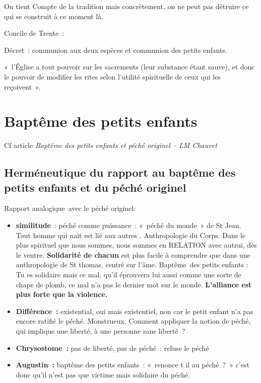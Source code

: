 On tient Compte de la tradition mais concrètement, on ne peut pas
détruire ce qui se construit à ce moment là.

Concile de Trente~:

Décret~: communion aux deux espèces et communion des petits enfants.
 
    «~l'Église a tout pouvoir sur les sacrements (leur substance étant
sauve), et donc le pouvoir de modifier les rites selon l'utilité
spirituelle de ceux qui les reçoivent~».
 


\hypertarget{d.-baptuxeame-des-petits-enfants}{%
\section{Baptême des petits
enfants}\label{d.-baptuxeame-des-petits-enfants}}

Cf article \emph{Baptême des petits enfants et péché originel -- LM
Chauvet}

\hypertarget{hermuxe9neutique-du-rapport-au-baptuxeame-des-petits-enfants-et-du-puxe9chuxe9-originel}{%
\subsection{Herméneutique du rapport au baptême des petits enfants et du
péché
originel}\label{hermuxe9neutique-du-rapport-au-baptuxeame-des-petits-enfants-et-du-puxe9chuxe9-originel}}

Rapport analogique~avec le péché originel:

\begin{itemize}
\item
  \textbf{similitude}~: péché comme puissance~: «~péché du monde~» de St
  Jean. Tout homme qui nait est lié aux autres . Anthropologie du Corps.
  Dans le plus spirituel que nous sommes, nous sommes en RELATION avec
  autrui, dès le ventre. \textbf{Solidarité de chacun} est plus facile à
  comprendre que dans une anthropologie de St thomas, centré sur l'âme.
  Baptême~des petits enfants : Tu es solidaire mais ce mal, qu'il
  éprouvera lui aussi comme une sorte de chape de plomb, ce mal n'a pas
  le dernier mot sur le monde. \textbf{L'alliance est plus forte que la
  violence.}
\item
  \textbf{Différence~:} existential, oui mais existentiel, non car le
  petit enfant n'a pas encore ratifié le péché. Monstrueux. Comment
  appliquer la notion de péché, qui implique une liberté, à une personne
  sans liberté~?
\item
  \textbf{Chrysostome~:} pas de liberté, pas de péché~: refuse le péché
\item
  \textbf{Augustin~:} baptême des petits enfants~: «~renonce t il au
  péché~?~» c'est donc qu'il n'est pas que victime mais solidaire du
  péché.
\end{itemize}

